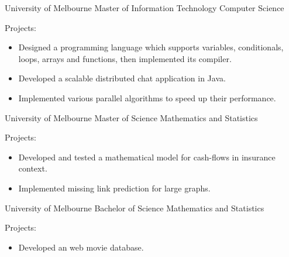 \documentclass[12pt]{article} %
\begin{document}
\begin{paracol}{2}
	{University of Melbourne}
	{Master of Information Technology} %
	{Computer Science}
	{Projects:
		\begin{itemize}
			\setlength{\itemsep}{1pt}	
			\item Designed a programming language which supports variables, conditionals, loops, arrays and functions, then implemented its compiler.
			\item Developed a scalable distributed chat application in Java.   
			\item Implemented various parallel algorithms to speed up their performance.
		\end{itemize}}
	{University of Melbourne}
	{Master of Science} %
	{Mathematics and Statistics}
	{Projects:
		\begin{itemize}
			\setlength{\itemsep}{1pt}	
			\item Developed and tested a mathematical model for cash-flows in insurance context.
			\item Implemented missing link prediction for large graphs.   
		\end{itemize}}
	{University of Melbourne}
	{Bachelor of Science} %
	{Mathematics and Statistics}
	{Projects:
		\begin{itemize}
			\setlength{\itemsep}{1pt}	
			\item Developed an web movie database.   
		\end{itemize}}






\end{paracol}
\end{document}

